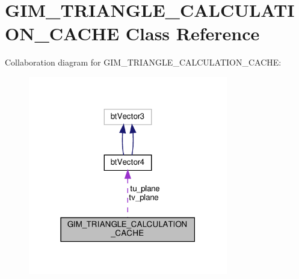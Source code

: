 \hypertarget{classGIM__TRIANGLE__CALCULATION__CACHE}{}\section{G\+I\+M\+\_\+\+T\+R\+I\+A\+N\+G\+L\+E\+\_\+\+C\+A\+L\+C\+U\+L\+A\+T\+I\+O\+N\+\_\+\+C\+A\+C\+HE Class Reference}
\label{classGIM__TRIANGLE__CALCULATION__CACHE}


Collaboration diagram for G\+I\+M\+\_\+\+T\+R\+I\+A\+N\+G\+L\+E\+\_\+\+C\+A\+L\+C\+U\+L\+A\+T\+I\+O\+N\+\_\+\+C\+A\+C\+HE\+:
\nopagebreak
\begin{figure}[H]
\begin{center}
\leavevmode
\includegraphics[width=247pt]{classGIM__TRIANGLE__CALCULATION__CACHE__coll__graph}
\end{center}
\end{figure}
